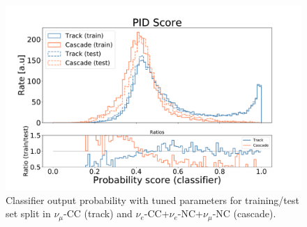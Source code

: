 \begin{figure}[h!]
    \centering
    \includegraphics[trim = 35 05 110 25, clip, width=0.8\linewidth]{figures/probability_distribution_step5_neu.pdf}
    \caption[Classifier output probability with tuned parameters]{Classifier output probability with tuned parameters for training/test set split in $\nu_\mu$-CC (track) and $\nu_e$-CC+$\nu_e$-NC+$\nu_\mu$-NC (cascade).}
    \label{fig:probability_distribution_tuned}
\end{figure}

